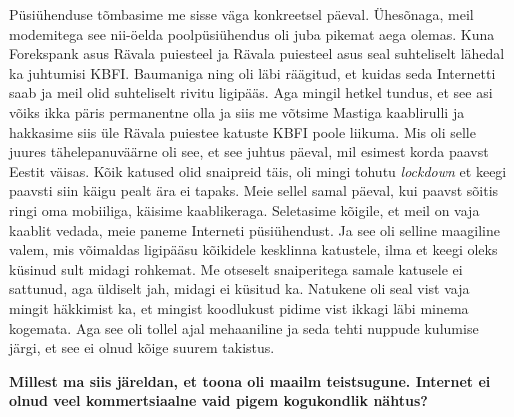 Püsiühenduse tõmbasime me sisse väga konkreetsel päeval. Ühesõnaga, meil 
modemitega see nii-öelda poolpüsiühendus oli juba pikemat aega olemas. Kuna 
Forekspank asus Rävala puiesteel ja Rävala puiesteel asus seal suhteliselt 
lähedal ka juhtumisi KBFI. Baumaniga ning 
oli läbi räägitud, et kuidas seda Internetti saab ja meil olid  suhteliselt 
rivitu ligipääs. Aga mingil hetkel tundus, et see asi võiks ikka päris 
permanentne olla ja siis me võtsime Mastiga kaablirulli ja 
hakkasime siis üle Rävala puiestee katuste KBFI poole liikuma. Mis oli selle 
juures tähelepanuväärne oli see, et see juhtus päeval, mil esimest korda paavst 
Eestit väisas. Kõik katused olid snaipreid täis, oli mingi tohutu 
\emph{lockdown} et keegi paavsti siin käigu pealt ära ei tapaks. Meie sellel 
samal päeval, kui paavst sõitis ringi oma mobiiliga, käisime kaablikeraga. 
Seletasime kõigile, et meil on vaja kaablit vedada, meie paneme Interneti 
püsiühendust. Ja see oli selline maagiline valem, mis  võimaldas ligipääsu 
kõikidele kesklinna katustele, ilma et keegi oleks küsinud sult midagi 
rohkemat. Me otseselt snaiperitega samale katusele ei sattunud, aga üldiselt 
jah, midagi ei küsitud ka. Natukene oli seal vist vaja mingit häkkimist ka, et 
mingist koodlukust pidime vist ikkagi läbi minema kogemata. Aga see oli tollel 
ajal mehaaniline ja seda tehti nuppude kulumise järgi, et see ei olnud kõige 
suurem takistus. 

\textbf{Millest ma siis järeldan, et toona oli maailm teistsugune. Internet ei 
olnud veel kommertsiaalne vaid pigem kogukondlik nähtus?}

